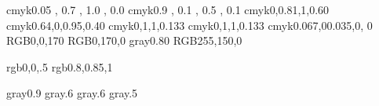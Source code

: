 % 
% 
% 
% 
%


\definecolor{varorange}		{cmyk}{0.05 , 0.7  , 1.0  , 0.0  }
\definecolor{stringgruen}	{cmyk}{0.9  , 0.1  , 0.5  , 0.1  }
\definecolor{Brown}		{cmyk}{0,0.81,1,0.60}
\definecolor{OliveGreen}	{cmyk}{0.64,0,0.95,0.40}
\definecolor{CadetBlue}		{cmyk}{0,1,1,0.133}
\definecolor{CadetRed}		{cmyk}{0,1,1,0.133}
\definecolor{markblue}		{cmyk}{0.067,00.035,0, 0}
\definecolor{blueT}		{RGB}{0,0,170}
\definecolor{greenT}		{RGB}{0,170,0}
\definecolor{grayT}		{gray}{0.80}
\definecolor{orangeT}	{RGB}{255,150,0}

\definecolor{darkblue}		{rgb}{0,0,.5}
\definecolor{lightblue}		{rgb}{0.8,0.85,1}


\definecolor{listinggray}	{gray}{0.9}
\definecolor{mygray}		{gray}{.6}
\definecolor{gray60}		{gray}{.6}
\definecolor{gray50}		{gray}{.5}